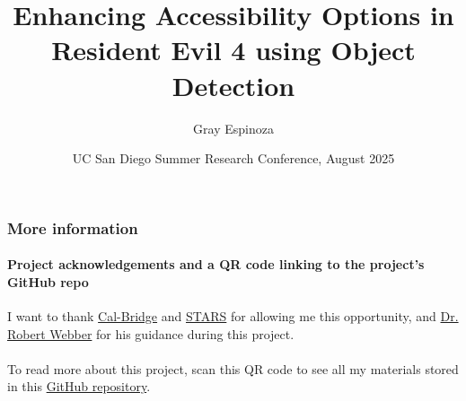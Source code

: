 \documentclass[aspectratio=43]{beamer}
\title[Enhancing Accessibility in Resident Evil 4]{Enhancing
Accessibility Options in Resident Evil 4 using Object Detection}
\author{Gray Espinoza}
\institute{California State University,\\Fullerton}
\date[13 August 2025]{UC San Diego Summer Research Conference, August 2025}
\begin{document}
\begin{frame}[plain]
  \titlepage
\end{frame}

\begin{frame}
  \frametitle{More information}
  \framesubtitle{Project acknowledgements and a QR code linking to
  the project's GitHub repo}

  I want to thank \href{https://calbridge.org}{Cal-Bridge} and
  \href{https://grad.ucsd.edu/oar2/oar2office/programs/undergraduate-programs/stars}{STARS}
  for allowing me this opportunity, and
  \href{https://sites.google.com/ucsd.edu/rwebber}{Dr. Robert Webber}
  for his guidance during this project.
  \\~\\

  To read more about this project, scan this QR code to see all my
  materials stored in this
  \href{https://github.com/grayespinoza/cbsp25}{GitHub repository}.
  \\~\\

  \begin{center}
  \end{center}
\end{frame}
\end{document}

